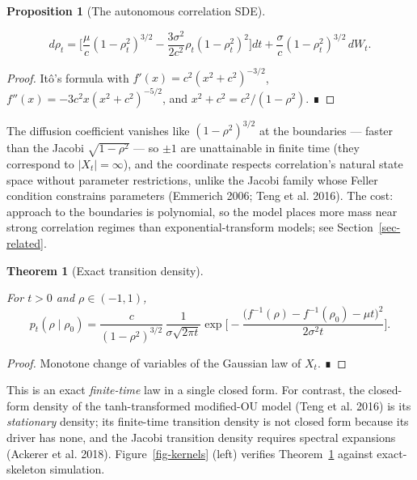 \documentclass[
  english,
  10pt,
  letterpaper,
  DIV=11,
  numbers=noendperiod]{scrartcl}
\newcounter{none} %
\theoremstyle{plain}
\newtheorem{theorem}{Theorem}[section]
\theoremstyle{plain}
\newtheorem{proposition}{Proposition}[section]
\theoremstyle{plain}
\theoremstyle{plain}
\theoremstyle{definition}
\theoremstyle{remark}
\begin{document}
\begin{proposition}[The autonomous correlation
SDE]\protect\hypertarget{prp-sde}{}\label{prp-sde}

\[
d\rho_t=
\Big[\frac{\mu}{c}(1-\rho_t^{2})^{3/2}
-\frac{3\sigma^{2}}{2c^{2}}\rho_t(1-\rho_t^{2})^{2}\Big]dt
+\frac{\sigma}{c}(1-\rho_t^{2})^{3/2}\,dW_t .
\]

\end{proposition}

\begin{proof}
Itô's formula with \(f'(x)=c^{2}(x^{2}+c^{2})^{-3/2}\),
\(f''(x)=-3c^{2}x(x^{2}+c^{2})^{-5/2}\), and
\(x^{2}+c^{2}=c^{2}/(1-\rho^{2})\). ∎
\end{proof}

The diffusion coefficient vanishes like \((1-\rho^{2})^{3/2}\) at the
boundaries --- faster than the Jacobi \(\sqrt{1-\rho^{2}}\) --- so
\(\pm1\) are unattainable in finite time (they correspond to
\(|X_t|=\infty\)), and the coordinate respects correlation's natural
state space without parameter restrictions, unlike the Jacobi family
whose Feller condition constrains parameters (Emmerich 2006; Teng et al.
2016). The cost: approach to the boundaries is polynomial, so the model
places more mass near strong correlation regimes than
exponential-transform models; see Section~\ref{sec-related}.

\begin{theorem}[Exact transition
density]\protect\hypertarget{thm-density}{}\label{thm-density}

For \(t>0\) and \(\rho\in(-1,1)\), \[
p_t(\rho\mid\rho_0)
=
\frac{c}{(1-\rho^{2})^{3/2}}\,
\frac{1}{\sigma\sqrt{2\pi t}}
\exp\!\Big[-\frac{\big(f^{-1}(\rho)-f^{-1}(\rho_0)-\mu t\big)^{2}}
{2\sigma^{2}t}\Big].
\]

\end{theorem}

\begin{proof}
Monotone change of variables of the Gaussian law of \(X_t\). ∎
\end{proof}

This is an exact \emph{finite-time} law in a single closed form. For
contrast, the closed-form density of the tanh-transformed modified-OU
model (Teng et al. 2016) is its \emph{stationary} density; its
finite-time transition density is not closed form because its driver has
none, and the Jacobi transition density requires spectral expansions
(Ackerer et al. 2018). Figure~\ref{fig-kernels} (left) verifies
Theorem~\ref{thm-density} against exact-skeleton simulation.
\end{document}
